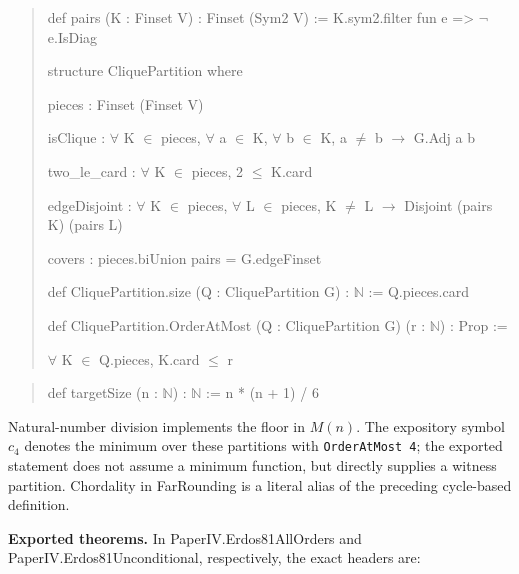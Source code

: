 \documentclass[english,11pt,a4paper]{article}
\begin{document}
\begin{quote}\footnotesize\ttfamily\raggedright
def pairs (K : Finset V) : Finset (Sym2 V) := K.sym2.filter fun e => \(\neg\) e.IsDiag\par
\par
structure CliquePartition where\par
  pieces : Finset (Finset V)\par
  isClique : \(\forall\) K \(\in\) pieces, \(\forall\) a \(\in\) K, \(\forall\) b \(\in\) K, a \(\ne\) b \(\to\) G.Adj a b\par
  two\_le\_card : \(\forall\) K \(\in\) pieces, 2 \(\le\) K.card\par
  edgeDisjoint : \(\forall\) K \(\in\) pieces, \(\forall\) L \(\in\) pieces, K \(\ne\) L \(\to\) Disjoint (pairs K) (pairs L)\par
  covers : pieces.biUnion pairs = G.edgeFinset\par
\par
def CliquePartition.size (Q : CliquePartition G) : \(\mathbb N\) := Q.pieces.card\par
\par
def CliquePartition.OrderAtMost (Q : CliquePartition G) (r : \(\mathbb N\)) : Prop :=\par
  \(\forall\) K \(\in\) Q.pieces, K.card \(\le\) r\par
\end{quote}

\begin{quote}\footnotesize\ttfamily\raggedright
def targetSize (n : \(\mathbb N\)) : \(\mathbb N\) := n * (n + 1) / 6\par
\end{quote}

Natural-number division implements the floor in \(M(n)\). The expository symbol \(c_4\) denotes the minimum over these partitions with \texttt{OrderAtMost\ 4}; the exported statement does not assume a minimum function, but directly supplies a witness partition. Chordality in {\ttfamily\small FarRounding} is a literal alias of the preceding cycle-based definition.

\textbf{Exported theorems.} In {\ttfamily\small PaperIV.\discretionary{\hbox{\ensuremath{\hookrightarrow}}}{}{}Erdos81AllOr\discretionary{\hbox{\ensuremath{\hookrightarrow}}}{}{}ders} and {\ttfamily\small PaperIV.\discretionary{\hbox{\ensuremath{\hookrightarrow}}}{}{}Erdos81Uncon\discretionary{\hbox{\ensuremath{\hookrightarrow}}}{}{}ditional}, respectively, the exact headers are:
\end{document}
